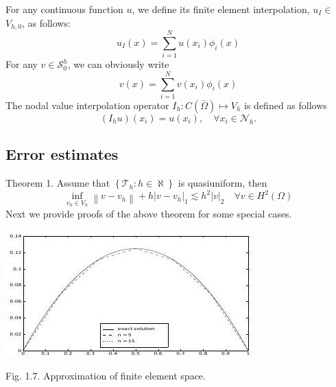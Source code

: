 \documentclass[10pt]{article}
\begin{document}
For any continuous function $u$, we define its finite element interpolation, $u_{I} \in$ $V_{h, 0}$, as follows:
$$
u_{I}(x)=\sum_{i=1}^{N} u\left(x_{i}\right) \phi_{i}(x)
$$
For any $v \in \mathcal{S}_{0}^{h}$, we can obviously write
$$
v(x)=\sum_{i=1}^{N} v\left(x_{i}\right) \phi_{i}(x)
$$
The nodal value interpolation operator $I_{h}: C(\bar{\Omega}) \mapsto V_{h}$ is defined as follows
$$
\left(I_{h} u\right)\left(x_{i}\right)=u\left(x_{i}\right), \quad \forall x_{i} \in \mathcal{N}_{h} .
$$

\subsection{Error estimates}
Theorem 1. Assume that $\left\{\mathcal{T}_{h}: h \in \aleph\right\}$ is quasiuniform, then
$$
\inf _{v_{h} \in V_{h}}\left\|v-v_{h}\right\|+h\left|v-v_{h}\right|_{1} \lesssim h^{2}|v|_{2} \quad \forall v \in H^{2}(\Omega)
$$
Next we provide proofs of the above theorem for some special cases.

\includegraphics[max width=\textwidth]{2022_01_05_15c63bf4a948497c30d9g-11}

Fig. 1.7. Approximation of finite element space.
\end{document}
